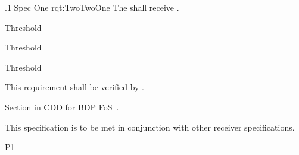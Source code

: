 \ONERQMTVKPP
{\RqtNumberBase.1}
{\ThisSubSegment Spec One}
{rqt:TwoTwoOne}
{The \ThisSys shall receive \TBD.}
{
	\item [Light]  Threshold
	\item [Medium] Threshold
	\item [Heavy]  Threshold
}
{This requirement shall be verified by \TBD.}
{
\item [5.6.1] Section in CDD for BDP FoS~\cite{ref__BDP_FOS_CDD}.
}
{
	\item This specification is to be met in conjunction with other receiver specifications.
}
{P1}

